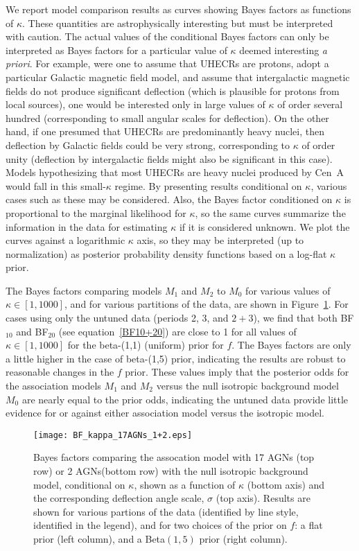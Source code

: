We report model comparison results as curves showing Bayes
factors as functions of $\kappa$.  These quantities are astrophysically
interesting but must be interpreted with caution.  The actual values of the
conditional Bayes factors can only be interpreted as Bayes factors for a
particular value of $\kappa$ deemed interesting {\em a priori}.  For example,
were one to assume that UHECRs are protons, adopt a particular Galactic
magnetic field model, and assume that intergalactic magnetic fields do not
produce significant deflection (which is plausible for protons from local
sources), one would be interested only in large values of $\kappa$ of order
several hundred (corresponding to small angular scales for deflection).  On
the other hand, if one presumed that UHECRs are predominantly heavy nuclei,
then deflection by Galactic fields could be very strong, corresponding to
$\kappa$ of order unity (deflection by intergalactic fields might also be
significant in this case).  Models hypothesizing that most UHECRs are
heavy nuclei produced by Cen~A would fall in this small-$\kappa$ regime.
By presenting results conditional on $\kappa$, various cases
such as these may be considered.  Also, the Bayes factor conditioned on
$\kappa$ is proportional to the marginal likelihood for $\kappa$, so the
same curves summarize the information in the data for estimating $\kappa$ if
it is considered unknown.  We plot the curves against a logarithmic $\kappa$
axis, so they may be interpreted (up to normalization) as posterior
probability density functions based on a log-flat $\kappa$ prior.

The Bayes factors comparing models $M_1$ and $M_2$ to $M_0$ for various values
of $\kappa\in[1,1000]$, and for various partitions of the data, are shown in
Figure~\ref{fig:BFplot}.  For cases using only the untuned data (periods 2, 3,
and $2+3$), we find that both BF$_{10}$ and BF$_{20}$ (see
equation~\ref{BF10+20}) are close to 1 for all values of $\kappa\in[1,1000]$
for the beta-(1,1) (uniform) prior for $f$.  The Bayes factors are only
a little higher in the case of beta-(1,5) prior, indicating the results
are robust to reasonable changes in the $f$ prior. These values imply
that the posterior odds for the association models $M_1$ and $M_2$
versus the null isotropic background model $M_0$ are nearly equal to the
prior odds, indicating the untuned data provide little evidence for or
against either association model versus the isotropic model.

\begin{figure}
\centerline{\texttt{[image: BF\_kappa\_17AGNs\_1+2.eps]}}
\caption{Bayes factors comparing the assocation model with 17 AGNs (top row) or
2 AGNs(bottom row) with the null isotropic background model, conditional
on $\kappa$, shown as a function of $\kappa$ (bottom axis) and the
corresponding deflection angle scale, $\sigma$ (top axis).  Results are
shown for various partions of the data (identified by line style,
identified in the legend), and for two choices of the prior on $f$: a
flat prior (left column), and a Beta$(1,5)$ prior (right column).}
\label{fig:BFplot}
\end{figure}

